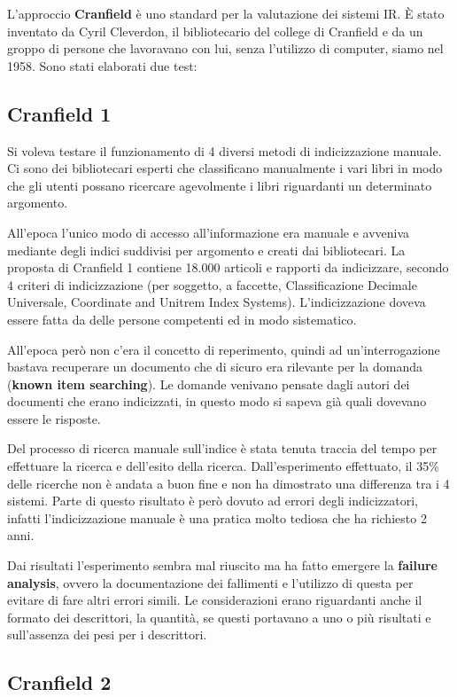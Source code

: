 L'approccio \textbf{Cranfield} è uno standard per la valutazione dei sistemi IR.
\`E stato inventato da Cyril Cleverdon, il bibliotecario del college di Cranfield e da un groppo di persone che lavoravano con lui, senza l'utilizzo di computer, siamo nel 1958. 
Sono stati elaborati due test:

\subsection{Cranfield 1} 

Si voleva testare il funzionamento di 4 diversi metodi di indicizzazione manuale. Ci sono dei bibliotecari esperti che classificano manualmente i vari libri in modo che gli utenti possano ricercare agevolmente i libri riguardanti un determinato argomento.

All'epoca l'unico modo di accesso all'informazione era manuale e avveniva mediante degli indici suddivisi per argomento e creati dai bibliotecari.
La proposta di Cranfield 1 contiene 18.000 articoli e rapporti da indicizzare, secondo 4 criteri di indicizzazione (per soggetto, a faccette, Classificazione Decimale Universale, Coordinate and Unitrem Index Systems). L'indicizzazione doveva essere fatta da delle persone competenti ed in modo sistematico.
	
All'epoca però non c'era il concetto di reperimento, quindi ad un'interrogazione bastava recuperare un documento che di sicuro era rilevante per la domanda (\textbf{known item searching}). Le domande venivano pensate dagli autori dei documenti che erano indicizzati, in questo modo si sapeva già quali dovevano essere le risposte.
	
Del processo di ricerca manuale sull'indice è stata tenuta traccia del tempo per effettuare la ricerca e dell'esito della ricerca. Dall'esperimento effettuato, il 35\% delle ricerche non è andata a buon fine e non ha dimostrato una differenza tra i 4 sistemi.
Parte di questo risultato è però dovuto ad errori degli indicizzatori, infatti l'indicizzazione manuale è una pratica molto tediosa che ha richiesto 2 anni.
	
Dai risultati l'esperimento sembra mal riuscito ma ha fatto emergere la \textbf{failure analysis}, ovvero la documentazione dei fallimenti e l'utilizzo di questa per evitare di fare altri errori simili. 
Le considerazioni erano riguardanti anche il formato dei descrittori, la quantità, se questi portavano a uno o più risultati e sull'assenza dei pesi per i descrittori.
	
\subsection{Cranfield 2}

